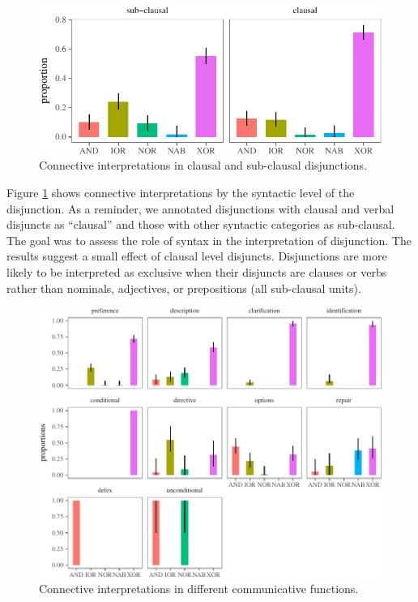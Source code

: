 \documentclass[oneside]{report}
\theoremstyle{definition}
\theoremstyle{definition}
\theoremstyle{definition}
\theoremstyle{remark}
\begin{document}
\begin{figure}[tb]

{\centering \includegraphics{figs/syntaxPlot-1} 

}

\caption{Connective interpretations in clausal and sub-clausal disjunctions.}\label{fig:syntaxPlot}
\end{figure}
Figure \ref{fig:syntaxPlot} shows connective interpretations by the
syntactic level of the disjunction. As a reminder, we annotated
disjunctions with clausal and verbal disjuncts as ``clausal'' and those
with other syntactic categories as sub-clausal. The goal was to assess
the role of syntax in the interpretation of disjunction. The results
suggest a small effect of clausal level disjuncts. Disjunctions are more
likely to be interpreted as exclusive when their disjuncts are clauses
or verbs rather than nominals, adjectives, or prepositions (all
sub-clausal units).
\begin{figure}[tb]

{\centering \includegraphics{figs/speechActPlot-1} 

}

\caption{Connective interpretations in different communicative functions.}\label{fig:speechActPlot}
\end{figure}
\end{document}
